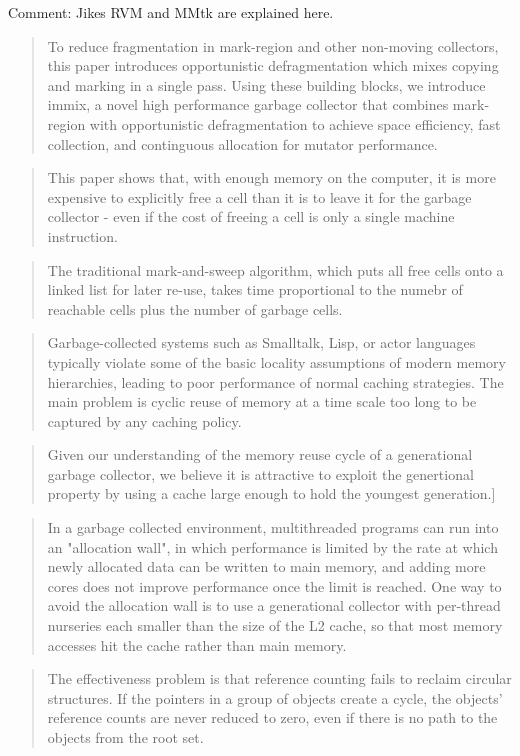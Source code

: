 \documentclass[a4paper,oneside]{memoir}
\newcommand{\makecomment}[1]{{\color{red} Comment: #1}}
\begin{document}
\makecomment{Jikes RVM and MMtk are explained here.}\cite{Blackburn:2004}

\blockquote{To reduce fragmentation in mark-region and other non-moving
collectors, this paper introduces opportunistic defragmentation which mixes
copying and marking in a single pass. Using these building blocks, we introduce
immix, a novel high performance garbage collector that combines mark-region with
opportunistic defragmentation to achieve space efficiency, fast collection, and
continguous allocation for mutator performance.\cite{Blackburn:2008}}

\blockquote{This paper shows that, with enough memory on the computer, it is
more expensive to explicitly free a cell than it is to leave it for the garbage
collector - even if the cost of freeing a cell is only a single machine
instruction.}
\cite{Appel:1987}

\blockquote{The traditional mark-and-sweep algorithm, which puts all free cells
onto a linked list for later re-use, takes time proportional to the numebr of
reachable cells plus the number of garbage cells.}
\cite{Appel:1987}

\blockquote{Garbage-collected systems such as Smalltalk, Lisp, or actor languages typically violate some of the basic locality assumptions of modern memory hierarchies, leading to poor performance of normal caching strategies. The main problem is cyclic reuse of memory at a time scale too long to be captured by any caching policy. \cite{Lam:1992}}


\blockquote{Given our understanding of the memory reuse cycle of a generational
garbage collector, we believe it is attractive to exploit the genertional
property by using a cache large enough to hold the youngest generation.]}
\cite{Lam:1992}

\blockquote{In a garbage collected environment, multithreaded programs can run
into an "allocation wall", in which performance is limited by the rate at which
newly allocated data can be written to main memory, and adding more cores does
not improve performance once the limit is reached. One way to avoid the
allocation wall is to use a generational collector with per-thread nurseries
each smaller than the size of the L2 cache, so that most memory accesses hit the
cache rather than main memory. \cite{Marlow:2011}}

\blockquote{The effectiveness problem is that reference counting fails to reclaim
circular structures. If the pointers in a group of objects create a cycle, the
objects' reference counts are never reduced to zero, even if there is no path
to the objects from the root set. \cite{Wilson:1992}}
\end{document}
